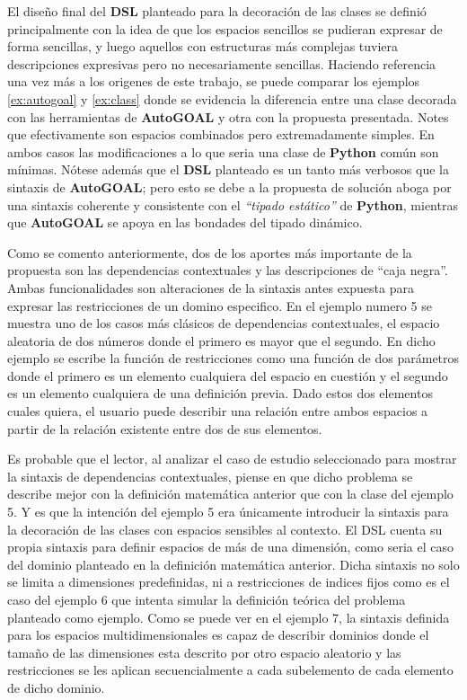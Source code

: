 El diseño final del {\bf DSL} planteado para la decoración de las clases se definió principalmente con la idea de
que los espacios sencillos se pudieran expresar de forma sencillas, y luego aquellos con estructuras más
complejas tuviera descripciones expresivas pero no necesariamente sencillas. Haciendo referencia una vez
más a los origenes de este trabajo, se puede comparar los ejemplos \ref{ex:autogoal} y \ref{ex:class} donde se
evidencia la diferencia entre una clase decorada con las herramientas de {\bf AutoGOAL} y otra con la propuesta
presentada. Notes que efectivamente son espacios combinados pero extremadamente simples. En ambos casos las
modificaciones a lo que seria una clase de {\bf Python} común son mínimas. Nótese además que el {\bf DSL}
planteado es un tanto más verbosos que la sintaxis de {\bf AutoGOAL}; pero esto se debe a la propuesta de solución
aboga por una sintaxis coherente y consistente con el {\it “tipado estático”} de {\bf Python}, mientras que
    {\bf AutoGOAL} se apoya en las bondades del tipado dinámico.

Como se comento anteriormente, dos de los aportes más importante de la propuesta son las dependencias
contextuales y las descripciones de “caja negra”. Ambas funcionalidades son alteraciones de la sintaxis
antes expuesta para expresar las restricciones de un domino especifico. En el ejemplo numero 5 se muestra
uno de los casos más clásicos de dependencias contextuales, el espacio aleatoria de dos números donde el
primero es mayor que el segundo. En dicho ejemplo se escribe la función de restricciones como una función
de dos parámetros donde el primero es un elemento cualquiera del espacio en cuestión y el segundo es un
elemento cualquiera de una definición previa. Dado estos dos elementos cuales quiera, el usuario puede
describir una relación entre ambos espacios a partir de la relación existente entre dos de sus elementos.

Es probable que el lector, al analizar el caso de estudio seleccionado para mostrar la sintaxis de dependencias
contextuales, piense en que dicho problema se describe mejor con la definición matemática anterior que con la
clase del ejemplo 5. Y es que la intención del ejemplo 5 era únicamente introducir la sintaxis para la decoración
de las clases con espacios sensibles al contexto. El DSL cuenta su propia sintaxis para definir espacios de más
de una dimensión, como seria el caso del dominio planteado en la definición matemática anterior. Dicha sintaxis
no solo se limita a dimensiones predefinidas, ni a restricciones de indices fijos como es el caso del ejemplo 6
que intenta simular la definición teórica del problema planteado como ejemplo. Como se puede ver en el ejemplo 7,
la sintaxis definida para los espacios multidimensionales es capaz de describir dominios donde el tamaño de las
dimensiones esta descrito por otro espacio aleatorio y las restricciones se les aplican secuencialmente a cada
subelemento de cada elemento de dicho dominio.

